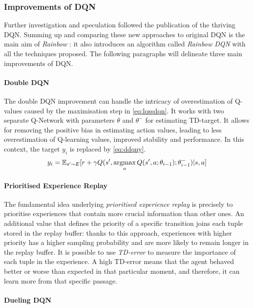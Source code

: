 \subsubsection{Improvements of DQN}
Further investigation and speculation followed the publication of the thriving DQN.
Summing up and comparing these new approaches to original DQN is the main aim of \textit{Rainbow} \cite{hessel2018rainbow}: it also introduces an algorithm called \textit{Rainbow DQN} with all the techniques proposed.
The following paragraphs will delineate three main improvements of DQN.

\paragraph{Double DQN}
The double DQN \cite{hasselt2010double, van2016deep} improvement can handle the intricacy of overestimation of Q-values caused by the maximisation step in \vref{eq:lossdqn}.
It works with two separate Q-Network with parameters $\theta$ and $\theta^-$ for estimating TD-target.
It allows for removing the positive bias in estimating action values, leading to less overestimation of Q-learning values, improved stability and performance.
In this context, the target $y_i$ is replaced by \vref{eq:ddqny}.
\begin{equation} \label{eq:ddqny}
	y_i = \mathbb{E}_{s' \sim E}[r + \gamma Q(s',\operatornamewithlimits{argmax}_aQ(s', a; \theta_{i-1}); \theta^-_{i-1})|s,a]
\end{equation}
\paragraph{Prioritised Experience Replay}

The fundamental idea underlying \textit{prioritised experience replay} \cite{schaul2015prioritized} is precisely to prioritise experiences that contain more crucial information than other ones.
An additional value that defines the priority of a specific transition joins each tuple stored in the replay buffer: thanks to this approach, experiences with higher priority has a higher sampling probability and are more likely to remain longer in the replay buffer.
It is possible to use \textit{TD-error} to measure the importance of each tuple in the experience.
A high TD-error means that the agent behaved better or worse than expected in that particular moment, and therefore, it can learn more from that specific passage.

\paragraph{Dueling DQN}

